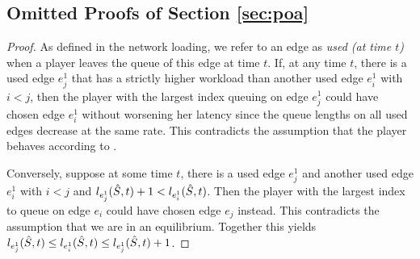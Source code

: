 \subsection{Omitted Proofs of Section \ref{sec:poa}}\label{app:sec4}
\lemmaAli*
\begin{proof}
As defined in the network loading, we refer to an edge as \emph{used (at time $t$)} when a player leaves the queue of this edge at time $t$.
If, at any time $t$, there is a used edge $e^1_j$ that has a strictly higher %
workload than another used edge $e^1_i$ with $i<j$, then the player with the largest index queuing on edge $e^1_j$ could have chosen edge $e^1_i$ without worsening her latency since the queue lengths on all used edges decrease at the same rate. This contradicts the assumption that the player behaves according to \badNash.

Conversely, suppose at some time $t$, there is a used edge $e^1_j$ and another used edge $e^1_i$ with $i<j$ and $l_{e^1_j}(\hat{S},t)+1<l_{e^1_i}(\hat{S},t)$.
Then the player with the largest index to queue on edge $e_i$ could have chosen edge $e_j$ instead. This contradicts the assumption that we are in an equilibrium.
Together this yields $l_{e^1_j}(\hat{S},t) \leq l_{e^1_i}(\hat{S},t) \leq l_{e^1_j}(\hat{S},t)+1$.
\end{proof}

